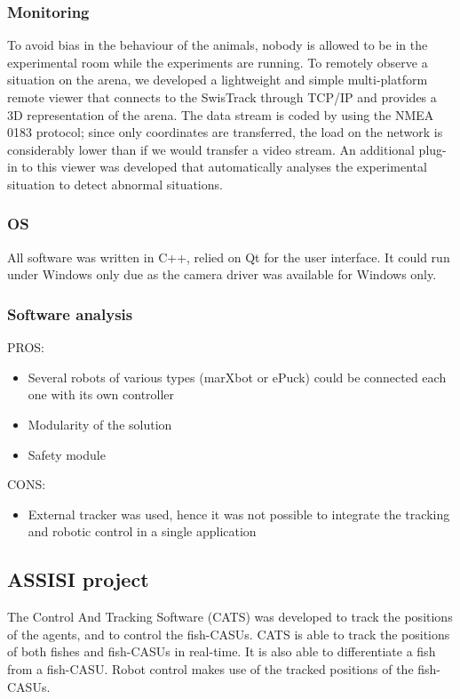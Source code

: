 \documentclass{styles/assisi}
\begin{document}
\subsubsection{Monitoring}
To avoid bias in the behaviour of the animals, nobody is allowed to be in the experimental room while the experiments are running. To remotely observe a situation on the arena, we developed a lightweight and simple multi-platform remote viewer that connects to the SwisTrack through TCP/IP and provides a 3D representation of the arena. The data stream is coded by using the NMEA 0183 protocol; since only coordinates are transferred, the load on the network is considerably lower than if we would transfer a video stream. An additional
plug-in to this viewer was developed that automatically analyses the experimental situation to detect abnormal situations.

\subsubsection{OS}
All software was written in C++, relied on Qt for the user interface. It could run under Windows only due as the camera driver was available for Windows only.

\subsubsection{Software analysis}

PROS:
\begin{itemize}
  \item Several robots of various types (marXbot or ePuck) could be connected each one with its own controller
  \item Modularity of the solution
  \item Safety module
\end{itemize}

CONS:
\begin{itemize}
  \item External tracker was used, hence it was not possible to integrate the tracking and robotic control in a single application
\end{itemize}


\subsection{ASSISI project}
The Control And Tracking Software (CATS) was developed to track the positions of the agents, and to control the fish-CASUs. CATS is able to track the positions of both fishes and fish-CASUs in real-time. It is also able to differentiate a fish from a fish-CASU. Robot control makes use of the tracked positions of the fish-CASUs. 
\end{document}
